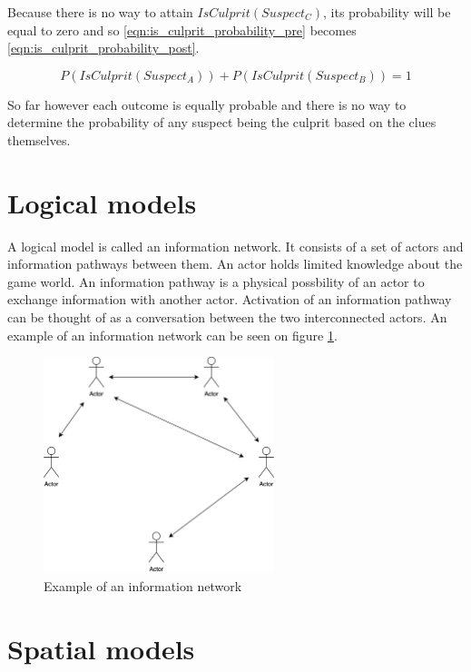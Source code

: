 Because there is no way to attain $IsCulprit \left( Suspect_C \right)$, its probability will be equal to zero and so \ref{eqn:is_culprit_probability_pre} becomes \ref{eqn:is_culprit_probability_post}.

\begin{equation}
    \label{eqn:is_culprit_probability_post}
    P \left( IsCulprit \left( Suspect_A \right) \right) + P \left( IsCulprit \left( Suspect_B \right) \right) = 1
\end{equation}

So far however each outcome is equally probable and there is no way to determine the probability of any suspect being the culprit based on the clues themselves.

\section{Logical models}

A logical model is called an information network.
It consists of a set of actors and information pathways between them.
An actor holds limited knowledge about the game world.
An information pathway is a physical possbility of an actor to exchange information with another actor.
Activation of an information pathway can be thought of as a conversation between the two interconnected actors.
An example of an information network can be seen on figure \ref{fig:logical_model_example}.

\begin{figure}
    \centering
    \includegraphics[width=0.6\textwidth]{images/logical_model_example.png}
    \caption{Example of an information network}
    \label{fig:logical_model_example}
\end{figure}

\section{Spatial models}

